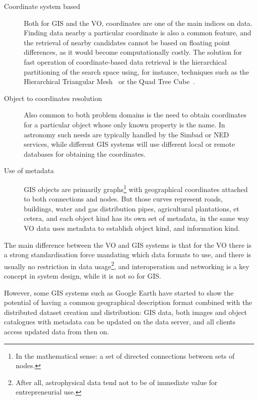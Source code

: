 		\begin{description}
			\item[Coordinate system based] Both for GIS and the VO,
			coordinates are one of the main indices on data.
			Finding data nearby a particular coordinate is also a
			common feature, and the retrieval of nearby candidates
			cannot be based on floating point differences, as it
			would become computationally costly. The solution for
			fast operation of coordinate-based data retrieval is
			the hierarchical partitioning of the search space
			using, for instance, techniques such as the
			Hierarchical Triangular Mesh~\cite{2001misk.conf..631K}
			or the Quad Tree Cube~\cite{2006ASPC..351..735K}.
			
			 \item[Object to coordinates resolution] Also common to
			both problem domains is the need to obtain coordinates
			for a particular object whose only known property is
			the name. In astronomy such needs are typically handled
			by the Simbad or NED services, while different GIS
			systems will use different local or remote databases
			for obtaining the coordinates.
			
			 \item[Use of metadata] GIS objects are primarily
			graphs\footnote{In the mathematical sense: a
			set of directed connections between sets of nodes.}
			with geographical coordinates attached to both
			connections and nodes. But those curves represent
			roads, buildings, water and gas distribution pipes,
			agricultural plantations, et cetera, and each object
			kind has its own set of metadata, in the same way VO
			data uses metadata to establish object kind, and
			information kind.
		\end{description} 
	
		The main difference between the VO and GIS systems is that
		for the VO there is a strong standardisation force
		mandating which data formats to use, and there is usually
		no restriction in data usage\footnote{After all,
		astrophysical data tend not to be of immediate value for
		entrepreneurial use.}, and interoperation and networking is
		a key concept in system design, while it is not so for GIS.
		
		 However, some GIS systems such as Google
		Earth have started to
		show the potential of having a common geographical
		description format combined with the distributed dataset
		creation and distribution: GIS data, both images and object
		catalogues with metadata can be updated on the data server,
		and all clients access updated data from then on.
		
